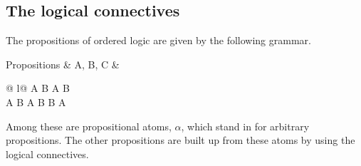 

\subsection{The logical connectives}

The propositions of ordered logic are given by the following grammar.
\begin{syntax*}
  Propositions & A, B, C &
    \alpha
    \begin{array}[t]{@{{} \mid {}}l@{}}
      A \fuse B \mid \one \mid A \plus B \mid \zero \\
      A \with B \mid \top \mid A \limp B \mid B \pmir A
    \end{array}
\end{syntax*}
Among these are propositional atoms, $\alpha$, which stand in for arbitrary propositions.
The other propositions are built up from these atoms by using the logical connectives.


